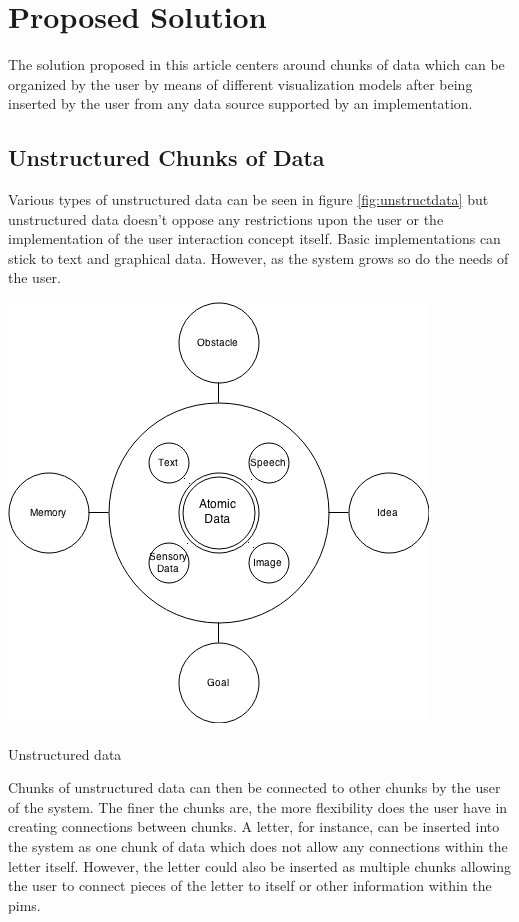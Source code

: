 \section{Proposed Solution}

The solution proposed in this article centers around chunks of data which can be
organized by the user by means of different visualization models after being
inserted by the user from any data source supported by an implementation.

\subsection{Unstructured Chunks of Data}

Various types of unstructured data can be seen in figure \ref{fig:unstructdata}
but unstructured data doesn't oppose any restrictions upon the user or the
implementation of the user interaction concept itself. Basic implementations can
stick to text and graphical data. However, as the system grows so do the needs
of the user.

\begin{flfigure}
  \centering
    \includegraphics[width=0.9\linewidth]{00_resources/atomic_data.png}
    \caption{Unstructured data}
  \label{fig:unstructdata}
\end{flfigure}

Chunks of unstructured data can then be connected to other chunks by the user of
the system. The finer the chunks are, the more flexibility does the user have in
creating connections between chunks. A letter, for instance, can be inserted
into the system as one chunk of data which does not allow any connections within
the letter itself. However, the letter could also be inserted as multiple chunks
allowing the user to connect pieces of the letter to itself or other
information within the \gls{pims}.

